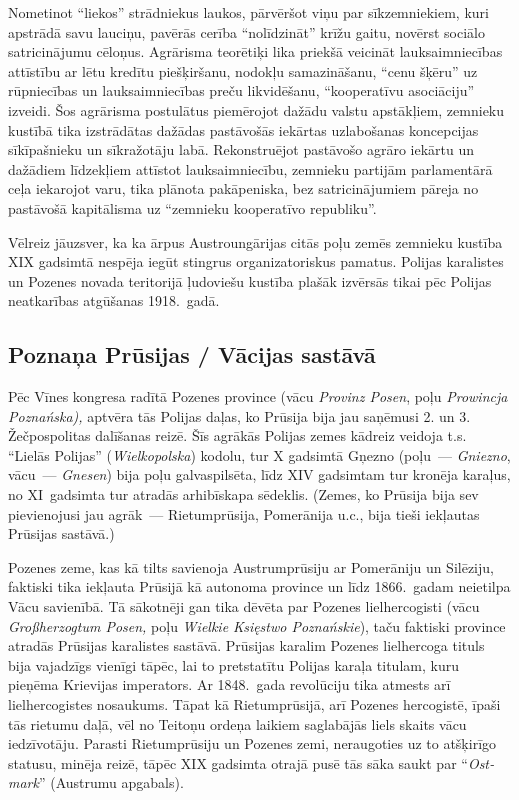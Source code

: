 \documentclass[twoside,a5paper,12pt,fleqn,openany]{extbook}
\newcommand{\pltxti}[1]{\textit{\textpolish{#1}}}
\newcommand{\detxti}[1]{\textit{\textgerman{#1}}}
\begin{document}
Nometinot ``liekos'' strādniekus laukos, pārvēršot viņu par sīkzemniekiem, kuri apstrādā savu lauciņu, pavērās cerība ``nolīdzināt'' krīžu gaitu, novērst sociālo satricinājumu cēloņus. Agrārisma teorētiķi lika priekšā veicināt lauksaimniecības attīstību ar lētu kredītu piešķiršanu, nodokļu samazināšanu, ``cenu šķēru'' uz rūpniecības un lauksaimniecības preču likvidēšanu, ``kooperatīvu asociāciju'' izveidi. Šos agrārisma postulātus piemērojot dažādu valstu apstākļiem, zemnieku kustībā tika izstrādātas dažādas pastāvošās iekārtas uzlabošanas koncepcijas sīkīpašnieku un sīkražotāju labā. Rekonstruējot pastāvošo agrāro iekārtu un dažādiem līdzekļiem attīstot lauksaimniecību, zemnieku partijām parlamentārā ceļa iekarojot varu, tika plānota pakāpeniska, bez satricinājumiem pāreja no pastāvošā kapitālisma uz ``zemnieku kooperatīvo republiku''.

Vēlreiz jāuzsver, ka ka ārpus Austroungārijas citās poļu zemēs zemnieku kustība XIX gadsimtā nespēja iegūt stingrus organizatoriskus pamatus. Polijas karalistes un Pozenes novada teritorijā ļudoviešu kustība plašāk izvērsās tikai pēc Polijas neatkarības atgūšanas 1918.~gadā.

\subsection{Poznaņa Prūsijas / Vācijas sastāvā}

Pēc Vīnes kongresa radītā Pozenes province (vācu \detxti{Provinz Posen}, poļu \pltxti{Prowincja Poznańska),} aptvēra tās Polijas daļas, ko Prūsija bija jau saņēmusi 2. un 3. Žečpospolitas dalīšanas reizē. Šīs agrākās Polijas zemes kādreiz veidoja t.s. ``Lielās Polijas'' (\pltxti{Wielkopolska}) kodolu, tur X gadsimtā Gņezno (poļu~--- \pltxti{Gniezno}, vācu~--- \detxti{Gnesen}) bija poļu galvaspilsēta, līdz XIV gadsimtam tur kronēja karaļus, no XI~gadsimta tur atradās arhibīskapa sēdeklis. (Zemes, ko Prūsija bija sev pievienojusi jau agrāk~--- Rietumprūsija, Pomerānija u.c., bija tieši iekļautas Prūsijas sastāvā.)

Pozenes zeme, kas kā tilts savienoja Austrumprūsiju ar Pomerāniju un Silēziju, faktiski tika iekļauta Prūsijā kā autonoma province un līdz 1866.~gadam neietilpa Vācu savienībā. Tā sākotnēji gan tika dēvēta par Pozenes lielhercogisti (vācu \detxti{Großherzogtum Posen,} poļu \pltxti{Wielkie Księstwo Poznańskie}), taču faktiski province atradās Prūsijas karalistes sastāvā. Prūsijas karalim Pozenes lielhercoga tituls bija vajadzīgs vienīgi tāpēc, lai to pretstatītu Polijas karaļa titulam, kuru pieņēma Krievijas imperators. Ar 1848.~gada revolūciju tika atmests arī lielhercogistes nosaukums. Tāpat kā Rietumprūsijā, arī Pozenes hercogistē, īpaši tās rietumu daļā, vēl no Teitoņu ordeņa laikiem saglabājās liels skaits vācu iedzīvotāju. Parasti Rietumprūsiju un Pozenes zemi, neraugoties uz to atšķirīgo statusu, minēja reizē, tāpēc XIX gadsimta otrajā pusē tās sāka saukt par ``\detxti{Ostmark}'' (Austrumu apgabals).
\end{document}
